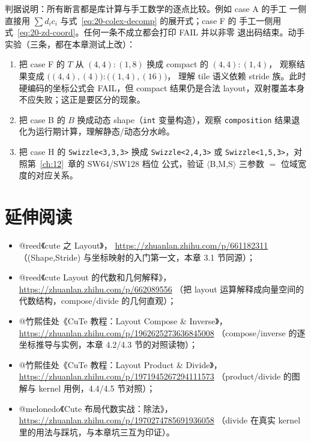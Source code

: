 判据说明：所有断言都是库计算与手工数学的逐点比较。例如 case A 的手工
一侧直接用 $\sum d_i c_i$ 与式~\eqref{eq:20-colex-decomp} 的展开式；case F 的
手工一侧用式~\eqref{eq:20-zd-coord}。任何一条不成立都会打印 FAIL 并以非零
退出码结束。动手实验（三条，都在本章测试上改）：

\begin{enumerate}
  \item 把 case F 的 $T$ 从 $(4,4){:}(1,8)$ 换成 compact 的 $(4,4){:}(1,4)$，
        观察结果变成 $\bigl((4,4),(4)\bigr){:}\bigl((1,4),(16)\bigr)$，
        理解 tile 语义依赖 stride 族。此时硬编码的坐标公式会 FAIL，但 compact
        结果仍是合法 layout，双射覆盖本身不应失败；这正是要区分的现象。
  \item 把 case B 的 $B$ 换成动态 shape（\texttt{int} 变量构造），观察
        \texttt{composition} 结果退化为运行期计算，理解静态/动态分水岭。
  \item 把 case H 的 \texttt{Swizzle\allowbreak{}<3,\allowbreak{}3,\allowbreak{}3>} 换成 \texttt{Swizzle\allowbreak{}<2,\allowbreak{}4,\allowbreak{}3>}
        或 \texttt{Swizzle\allowbreak{}<1,\allowbreak{}5,\allowbreak{}3>}，对照第~\ref{ch:12}~章的 SW64/SW128 档位
        公式，验证 $\langle$B,M,S$\rangle$ 三参数 $=$ 位域宽度的对应关系。
\end{enumerate}

\section*{延伸阅读}

\begin{itemize}
  \item @reed《cute 之 Layout》，
        \url{https://zhuanlan.zhihu.com/p/661182311}
        （(Shape,Stride) 与坐标映射的入门第一文，本章 3.1 节同源）；
  \item @reed《cute Layout 的代数和几何解释》，
        \url{https://zhuanlan.zhihu.com/p/662089556}
        （把 layout 运算解释成向量空间的代数结构，compose/divide 的几何直观）；
  \item @竹熙佳处《CuTe 教程：Layout Compose \& Inverse》，
        \url{https://zhuanlan.zhihu.com/p/1962625273636845008}
        （compose/inverse 的逐坐标推导与实例，本章 4.2/4.3 节的对照读物）；
  \item @竹熙佳处《CuTe 教程：Layout Product \& Divide》，
        \url{https://zhuanlan.zhihu.com/p/1971945267294111573}
        （product/divide 的图解与 kernel 用例，4.4/4.5 节对照）；
  \item @melonedo《Cute 布局代数实战：除法》，
        \url{https://zhuanlan.zhihu.com/p/1970274785691936058}
        （divide 在真实 kernel 里的用法与踩坑，与本章坑三互为印证）。
\end{itemize}
